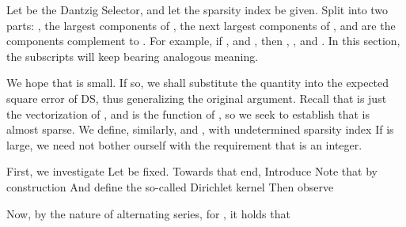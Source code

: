 \startsection [title={Almost-Sparsity of Angular Channel Response}]
\startsubsection [title={Norm of Array Response}]

Let  be the Dantzig Selector, and let the sparsity index  be given.
Split  into two parts: , the largest  components of ,  the next  largest components of , and  are the components complement to .
For example, if , and , then , , and .
In this section, the subscripts  will keep bearing analogous meaning.

We hope that  is small.
If so, we shall substitute the quantity into the expected square error of DS, thus generalizing the original argument.
Recall that  is just the vectorization of , and  is the function of , so we seek to establish that  is almost sparse.
We define, similarly,  and , with undetermined sparsity index
%
%
If  is large, we need not bother ourself with the requirement that  is an integer.

First, we investigate
%
%
Let \m {\f} be fixed.
Towards that end, 
Introduce
%
%
Note that by construction
%
%
And define the so-called Dirichlet kernel
%
%
Then observe
%

Now, by the nature of alternating series, for , it holds that
%

